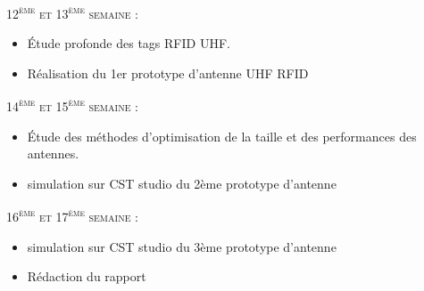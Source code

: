 \documentclass[11pt, a4paper, twoside]{book}
\begin{document}
\textsc{12\textsuperscript{ème} et 13\textsuperscript{ème} semaine :}
\begin{itemize}
\item Étude profonde des tags RFID UHF.
\item Réalisation du 1er prototype d'antenne UHF RFID
\end{itemize}
\textsc{14\textsuperscript{ème} et 15\textsuperscript{ème} semaine :}
\begin{itemize}
\item Étude des méthodes d'optimisation de la taille et des performances des antennes.
\item simulation sur CST studio du 2ème prototype d'antenne
\end{itemize}
\textsc{16\textsuperscript{ème} et 17\textsuperscript{ème} semaine :}
\begin{itemize}
\item simulation sur CST studio du 3ème prototype d'antenne
\item Rédaction du rapport\\\\\\\\\\\\\
\end{itemize}
\pagebreak
\end{document}
